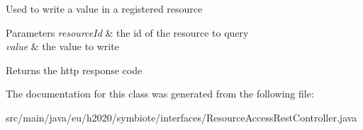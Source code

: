 Used to write a value in a registered resource


\begin{DoxyParams}{Parameters}
{\em resource\+Id} & the id of the resource to query \\
\hline
{\em value} & the value to write \\
\hline
\end{DoxyParams}
\begin{DoxyReturn}{Returns}
the http response code 
\end{DoxyReturn}


The documentation for this class was generated from the following file\+:\begin{DoxyCompactItemize}
\item 
src/main/java/eu/h2020/symbiote/interfaces/Resource\+Access\+Rest\+Controller.\+java\end{DoxyCompactItemize}
